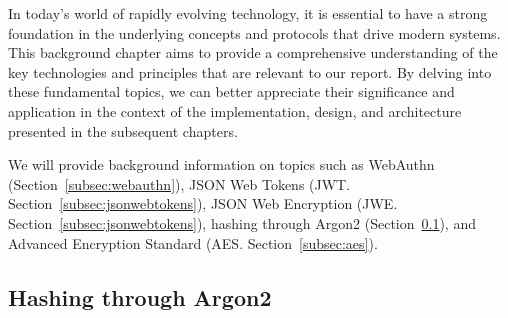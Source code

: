 
In today's world of rapidly evolving technology, it is essential to have a
strong foundation in the underlying concepts and protocols that drive modern
systems.
This background chapter aims to provide a comprehensive understanding of the key
technologies and principles that are relevant to our report.
By delving into these fundamental topics, we can better appreciate their
significance and application in the context of the implementation, design, and
architecture presented in the subsequent chapters.


We will provide background information on topics such as WebAuthn
(Section~\ref{subsec:webauthn}), JSON Web Tokens (JWT\@.
Section~\ref{subsec:jsonwebtokens}), JSON Web Encryption (JWE\@.
Section~\ref{subsec:jsonwebtokens}), hashing through Argon2
(Section~\ref{subsec:hashing-through-argon2}), and Advanced Encryption Standard
(AES. Section~\ref{subsec:aes}).

\subsection{Hashing through Argon2}\label{subsec:hashing-through-argon2}


